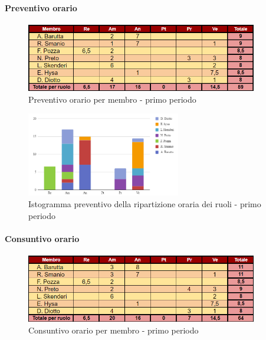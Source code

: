 \paragraph{Preventivo orario}

\begin{figure}[H] 
    \centering
    \includegraphics[width=0.9\textwidth]{../Images/preventivoOrario1Periodo.png}
    \caption{Preventivo orario per membro - primo periodo}
    \label{fig:Preventivo_orario_1}
\end{figure}

\vspace{0.6cm}

\begin{figure}[H]
    \centering
    \includegraphics[width=0.6\textwidth]{../Images/preventivoDivisioneRuoli1Periodo.png}
    \caption{Istogramma preventivo della ripartizione oraria dei ruoli - primo periodo}
    \label{fig:Preventivo_ripartizione_oraria_1}
\end{figure}

\pagebreak

\paragraph{Consuntivo orario}

\begin{figure}[H]
    \centering
    \includegraphics[width=0.9\textwidth]{../Images/consuntivoOrario1Periodo.png}
    \caption{Consuntivo orario per membro - primo periodo}
    \label{fig:Constuntivo_orario_1}
\end{figure}


